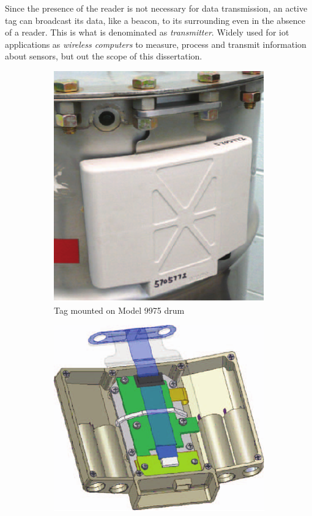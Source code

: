 Since the presence of the reader is not necessary for data transmission, an active tag can broadcast its data, like a beacon, to its surrounding even in the absence of a reader. This is what is denominated as \emph{transmitter}.
Widely used for \ac{iot} applications as \textit{wireless computers} to measure, process and transmit information about sensors, but out the scope of this dissertation. 

\begin{figure}[!ht]
    \centering
    \begin{subfigure}{.4\textwidth}
        \centering
        \includegraphics[width=.8\linewidth]{./figs/02-state-of-the-art/active_tag1.pdf}
        \caption{Tag mounted on Model 9975 drum}
        \label{fig:activetagsub1}
    \end{subfigure}
    \begin{subfigure}{.4\textwidth}
        \centering
        \includegraphics[width=0.95\linewidth]{./figs/02-state-of-the-art/active_tag2.pdf}

\end{subfigure}
\end{figure}
